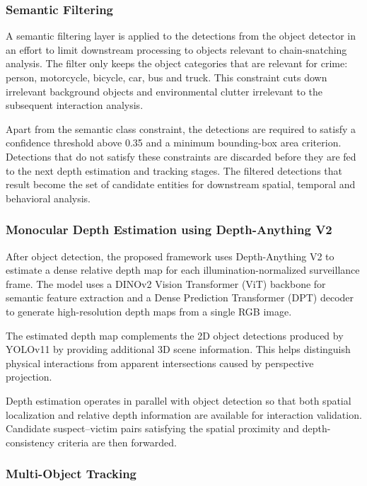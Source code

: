 \documentclass[runningheads]{llncs}
\begin{document}
\subsubsection{Semantic Filtering}

A semantic filtering layer is applied to the detections from the object detector in an effort to limit downstream processing to objects relevant to chain-snatching analysis. The filter only keeps the object categories that are relevant for crime: person, motorcycle, bicycle, car, bus and truck. This constraint cuts down irrelevant background objects and environmental clutter irrelevant to the subsequent interaction analysis.

Apart from the semantic class constraint, the detections are required to satisfy a confidence threshold above 0.35 and a minimum bounding-box area criterion. Detections that do not satisfy these constraints are discarded before they are fed to the next depth estimation and tracking stages. The filtered detections that result become the set of candidate entities for downstream spatial, temporal and behavioral analysis.

\subsubsection{Monocular Depth Estimation using Depth-Anything V2}

After object detection, the proposed framework uses Depth-Anything V2
\cite{yang2024depth} to estimate a dense relative depth map for each
illumination-normalized surveillance frame. The model uses a DINOv2 Vision
Transformer (ViT) backbone for semantic feature extraction and a Dense
Prediction Transformer (DPT) decoder to generate high-resolution depth maps
from a single RGB image.

The estimated depth map complements the 2D object detections produced by
YOLOv11 by providing additional 3D scene information. This helps distinguish
physical interactions from apparent intersections caused by perspective
projection.

Depth estimation operates in parallel with object detection so that both
spatial localization and relative depth information are available for
interaction validation. Candidate suspect--victim pairs satisfying the
spatial proximity and depth-consistency criteria are then forwarded. 

\subsubsection{Multi-Object Tracking}
\end{document}
